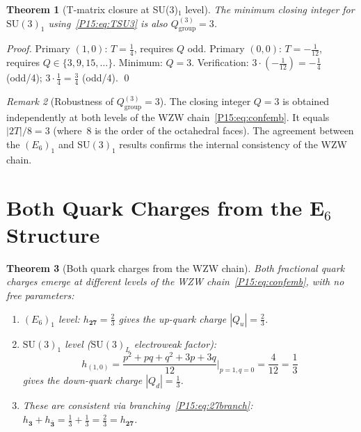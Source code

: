 \documentclass[11pt,a4paper]{article}
\newtheorem{theorem}{Theorem}[section]
\theoremstyle{definition}\newtheorem{definition}[theorem]{Definition}
\theoremstyle{remark}
\newtheorem{remark}[theorem]{Remark}
\newcommand{\SU}{\mathrm{SU}}
\begin{document}
\begin{theorem}[T-matrix closure at SU(3)$_1$ level]
\label{P15:thm:Qgroup3}
The minimum closing integer for $\SU(3)_1$ using~\eqref{P15:eq:TSU3} is
also $Q_{\mathrm{group}}^{(3)}=3$.
\end{theorem}
\begin{proof}
Primary $(1,0)$: $T=\tfrac{1}{4}$, requires $Q$ odd.
Primary $(0,0)$: $T=-\tfrac{1}{12}$, requires $Q\in\{3,9,15,\ldots\}$.
Minimum: $Q=3$.
Verification: $3\cdot(-\tfrac{1}{12})=-\tfrac{1}{4}$ (odd/4);\;
$3\cdot\tfrac{1}{4}=\tfrac{3}{4}$ (odd/4).
\qed
\end{proof}

\begin{remark}[Robustness of $Q_{\mathrm{group}}^{(3)}=3$]
\label{P15:rem:qgroup_robustness}
The closing integer $Q=3$ is obtained independently at both levels
of the WZW chain~\eqref{P15:eq:confemb}.
It equals $|2T|/8=3$ (where~8 is the order of the
octahedral faces).
The agreement between the $(E_6)_1$ and $\SU(3)_1$ results
confirms the internal consistency of the WZW chain.
\end{remark}

\section{Both Quark Charges from the E$_6$ Structure}
\label{P15:sec:quarkcharge}

\begin{theorem}[Both quark charges from the WZW chain]
\label{P15:thm:charge}
Both fractional quark charges emerge at different levels of the
WZW chain~\eqref{P15:eq:confemb}, with no free parameters:
\begin{enumerate}[noitemsep,label=(\roman*)]
\item $(E_6)_1$ level: $h_{\mathbf{27}}=\tfrac{2}{3}$
  gives the up-quark charge $|Q_u|=\tfrac{2}{3}$.
\item $\SU(3)_1$ level ($\SU(3)_L$ electroweak factor):
  \begin{equation}
    h_{(1,0)} = \frac{p^2+pq+q^2+3p+3q}{12}\bigg|_{p=1,q=0}
              = \frac{4}{12} = \frac{1}{3}
    \label{P15:eq:hdown}
  \end{equation}
  gives the down-quark charge $|Q_d|=\tfrac{1}{3}$.
\item These are consistent via branching~\eqref{P15:eq:27branch}:
  $h_{\mathbf{3}}+h_{\bar{\mathbf{3}}}
  =\tfrac{1}{3}+\tfrac{1}{3}=\tfrac{2}{3}=h_{\mathbf{27}}$.
\end{enumerate}
\end{theorem}
\end{document}
